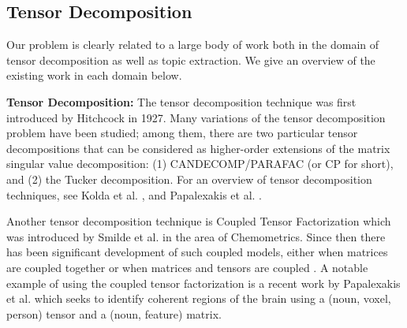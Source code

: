 \subsection{Tensor Decomposition}
Our problem is clearly related to a large body of work both in the domain of
tensor decomposition as well as topic extraction. We give an overview of the existing
work in each domain below.

\textbf{Tensor Decomposition:}
The tensor decomposition technique was first introduced by Hitchcock \cite{hitchcock1927expression} in 1927.
Many variations of the tensor decomposition problem have been studied; among them, there are two particular tensor decompositions that can be considered as higher-order extensions
of the matrix singular value decomposition: (1) CANDECOMP/PARAFAC (or CP for short), and (2) the Tucker decomposition. For an overview of tensor decomposition techniques, see Kolda et al.   \cite{kolda2009tensor},
and Papalexakis et al. \cite{papalexakis2016tensors}. 


Another tensor decomposition technique is Coupled Tensor Factorization which was introduced by Smilde et al.  \cite{smilde2000multiway} in the area of Chemometrics.
Since then there has been significant development of such coupled models, either when matrices are coupled
together \cite{singh2008relational} or when matrices and tensors are coupled  \cite{ermics2015link,narita2011tensor}. A notable example of using
the coupled tensor factorization is a recent work by Papalexakis et al. \cite{papalexakis2014turbo} which seeks
to identify coherent regions of the brain using a (noun, voxel, person) tensor and a (noun, feature) matrix.


